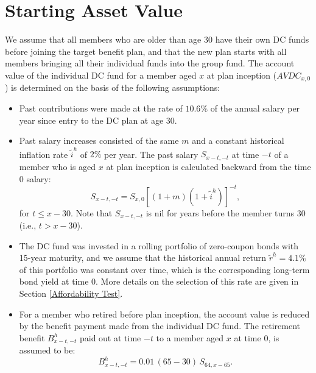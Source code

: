 \documentclass{sfuthesis}
\numberwithin{equation}{chapter}
\begin{document}
	
	\section{Starting Asset Value}
	\label{Starting Asset Value}


		\justify
		We assume that all members who are older than age 30 have their own DC funds before joining the target benefit plan, and that the new plan starts with all members bringing all their individual funds into the group fund. The account value of the individual DC fund for a member aged $x$ at plan inception ($AVDC_{x,0}$) is determined on the basis of the following assumptions:
		
		\begin{itemize}
			\item Past contributions were made at the rate of $10.6\%$ of the annual salary per year since entry to the DC plan at age $30$.
			
			\item Past salary increases consisted of the same $m$ and a constant historical inflation rate $\tilde{i}^h$ of $2\%$ per year. The past salary $S_{x-t,-t}$ at time $-t$ of a member who is aged $x$ at plan inception is calculated backward from the time $0$ salary:
			\begin{equation}
			\label{eq:STBP_12}
			S_{x-t,-t} = S_{x,0}\left[(1+m)(1+\tilde{i}^h)\right]^{-t},
			\end{equation}
			for $t\leqslant x - 30$. Note that $S_{x-t,-t}$ is nil for years before the member turns $30$ (i.e., $t>x-30$).
			
			\item The DC fund was invested in a rolling portfolio of zero-coupon bonds with 15-year maturity, and we assume that the historical annual return $\tilde{r}^{h} = 4.1\%$ of this portfolio was constant over time, which is the corresponding long-term bond yield at time $0$. More details on the selection of this rate are given in Section \ref{Affordability Test}.
			
			\item For a member who retired before plan inception, the account value is reduced by the benefit payment made from the individual DC fund. The retirement benefit $B^{h}_{x-t,-t}$ paid out at time $-t$ to a member aged $x$ at time $0$, is assumed to be:
			\begin{equation}
			\label{eq:STBP_13}
			B^{h}_{x-t,-t} = 0.01\, (65-30) \, S_{64,x-65}.
			\end{equation}
		\end{itemize}
	
\end{document}
